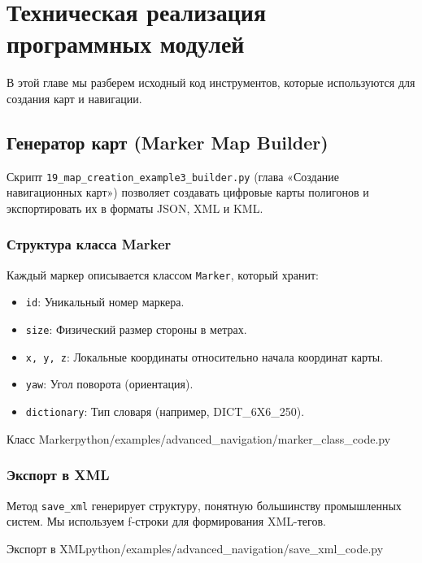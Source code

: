 \section{Техническая реализация программных модулей}

В этой главе мы разберем исходный код инструментов, которые используются для создания карт и навигации.

\subsection{Генератор карт (Marker Map Builder)}
Скрипт \texttt{19\_map\_creation\_example3\_builder.py} (глава «Создание навигационных карт») позволяет создавать цифровые карты полигонов и экспортировать их в форматы JSON, XML и KML.

\subsubsection{Структура класса Marker}
Каждый маркер описывается классом \texttt{Marker}, который хранит:
\begin{itemize}
    \item \texttt{id}: Уникальный номер маркера.
    \item \texttt{size}: Физический размер стороны в метрах.
    \item \texttt{x, y, z}: Локальные координаты относительно начала координат карты.
    \item \texttt{yaw}: Угол поворота (ориентация).
    \item \texttt{dictionary}: Тип словаря (например, DICT\_6X6\_250).
\end{itemize}

\begin{codefiletitle}[python]{Класс Marker}{python/examples/advanced_navigation/marker_class_code.py}
\end{codefiletitle}

\subsubsection{Экспорт в XML}
Метод \texttt{save\_xml} генерирует структуру, понятную большинству промышленных систем. Мы используем f-строки для формирования XML-тегов.

\begin{codefiletitle}[python]{Экспорт в XML}{python/examples/advanced_navigation/save_xml_code.py}
\end{codefiletitle}

